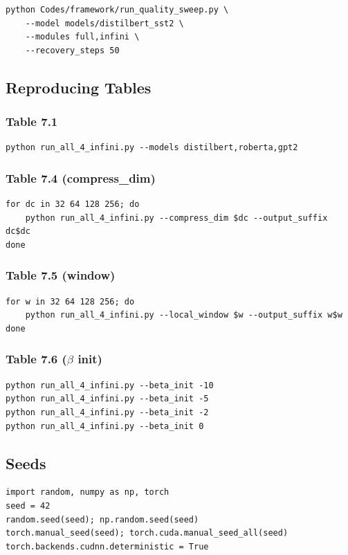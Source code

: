\begin{lstlisting}
python Codes/framework/run_quality_sweep.py \
    --model models/distilbert_sst2 \
    --modules full,infini \
    --recovery_steps 50
\end{lstlisting}

\subsection{Reproducing Tables}

\subsubsection{Table 7.1}
\begin{lstlisting}
python run_all_4_infini.py --models distilbert,roberta,gpt2
\end{lstlisting}

\subsubsection{Table 7.4 (compress\_dim)}
\begin{lstlisting}
for dc in 32 64 128 256; do
    python run_all_4_infini.py --compress_dim $dc --output_suffix dc$dc
done
\end{lstlisting}

\subsubsection{Table 7.5 (window)}
\begin{lstlisting}
for w in 32 64 128 256; do
    python run_all_4_infini.py --local_window $w --output_suffix w$w
done
\end{lstlisting}

\subsubsection{Table 7.6 ($\beta$ init)}
\begin{lstlisting}
python run_all_4_infini.py --beta_init -10
python run_all_4_infini.py --beta_init -5
python run_all_4_infini.py --beta_init -2
python run_all_4_infini.py --beta_init 0
\end{lstlisting}

\subsection{Seeds}

\begin{lstlisting}
import random, numpy as np, torch
seed = 42
random.seed(seed); np.random.seed(seed)
torch.manual_seed(seed); torch.cuda.manual_seed_all(seed)
torch.backends.cudnn.deterministic = True
\end{lstlisting}

